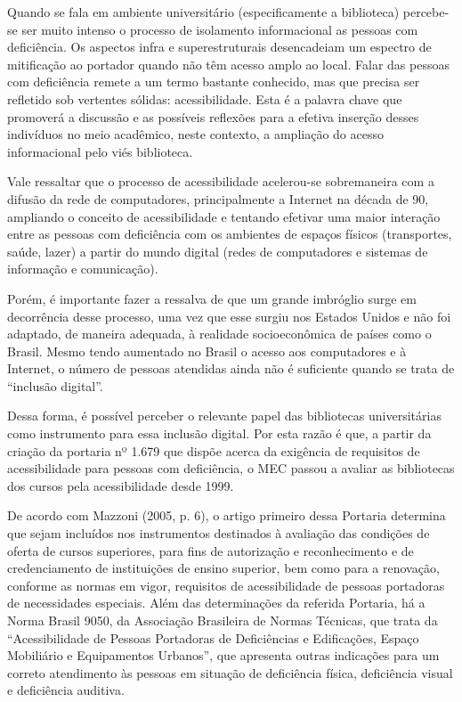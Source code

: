 	Quando se fala em ambiente universitário (especificamente a biblioteca) percebe-se ser muito intenso o processo de isolamento informacional as pessoas com deficiência. Os aspectos infra e superestruturais desencadeiam um espectro de mitificação ao portador quando não têm acesso amplo ao local.
Falar das pessoas com deficiência remete a um termo bastante conhecido, mas que precisa ser refletido sob vertentes sólidas: acessibilidade. Esta é a palavra chave que promoverá a discussão e as possíveis reflexões para a efetiva inserção desses indivíduos no meio acadêmico, neste contexto, a ampliação do acesso informacional pelo viés biblioteca.


	Vale ressaltar que o processo de acessibilidade acelerou-se sobremaneira com a difusão da rede de computadores, principalmente a Internet na década de 90, ampliando o conceito de acessibilidade e tentando efetivar uma maior interação entre as pessoas com deficiência com os ambientes de espaços físicos (transportes, saúde, lazer) a partir do mundo digital (redes de computadores e sistemas de informação e comunicação).

	Porém, é importante fazer a ressalva de que um grande imbróglio surge em decorrência desse processo, uma vez que esse surgiu nos Estados Unidos e não foi adaptado, de maneira adequada, à realidade socioeconômica de países como o Brasil. Mesmo tendo aumentado no Brasil o acesso aos computadores e à Internet, o número de pessoas atendidas ainda não é suficiente quando se trata de ``inclusão digital''.

	Dessa forma, é possível perceber o relevante papel das bibliotecas universitárias como instrumento para essa inclusão digital. Por esta razão é que, a partir da criação da portaria nº 1.679 que dispõe acerca da exigência de requisitos de acessibilidade para pessoas com deficiência, o MEC passou a avaliar as bibliotecas dos cursos pela acessibilidade desde 1999.

	De acordo com Mazzoni (2005, p. 6), o artigo primeiro dessa Portaria determina que sejam incluídos nos instrumentos destinados à avaliação das condições de oferta de cursos superiores, para fins de autorização e reconhecimento e de credenciamento de instituições de ensino superior, bem como para a renovação, conforme as normas em vigor, requisitos de acessibilidade de pessoas portadoras de necessidades especiais. Além das determinações da referida Portaria, há a Norma Brasil 9050, da Associação Brasileira de Normas Técnicas, que trata da “Acessibilidade de Pessoas Portadoras de Deficiências e Edificações, Espaço Mobiliário e Equipamentos Urbanos”, que apresenta outras indicações para um correto atendimento às pessoas em situação de deficiência física, deficiência visual e deficiência auditiva.

